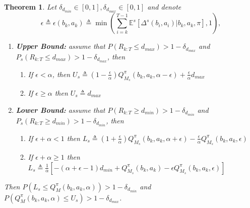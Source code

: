 \documentclass[acmlarge, manuscript, screen, review, natbib=false, oneside]{acmart}
\newtheorem{theorem}{Theorem}[section]
\begin{document}
\begin{theorem}\label{prf:uniform_lower_and_upper_bounds_for_v_and_q}
	Let $\delta_{d_{min}}\in [0, 1], \delta_{d_{max}}\in [0, 1]$ and denote 
	\begin{equation}
		\epsilon \triangleq \epsilon(b_k, a_k) \triangleq \min(\sum_{i=k}^{T-1} \mathbb{E}^s[\Delta^s(b_i, a_i)|b_k, a_k,\pi], 1),
	\end{equation}
	\begin{enumerate}
		\item \textbf{Upper Bound:} assume that $P(R_{k:T}\leq d_{max})>1-\delta_{d_{max}}$ and $P_s(R_{k:T}\leq d_{max})>1-\delta_{d_{max}}$, then \begin{enumerate}
			\item If $\epsilon<\alpha$, then
			$U_s\triangleq (1-\frac{\epsilon}{\alpha}) Q^\pi_{M_s}(b_k,a_k,\alpha-\epsilon) + \frac{\epsilon}{\alpha}d_{max}$
			\item If $\epsilon \geq \alpha$ then $U_s\triangleq d_{max}$
		\end{enumerate}
		\item \textbf{Lower Bound:} assume that $P(R_{k:T}\geq d_{min})>1-\delta_{d_{min}}$ and $P_s(R_{k:T}\geq d_{min})>1-\delta_{d_{min}}$, then \begin{enumerate}
			\item If $\epsilon + \alpha < 1$ then 
			$
			L_s\triangleq (1+\frac{\epsilon}{\alpha}) Q^\pi_{M_s}(b_k,a_k,\alpha+\epsilon) - \frac{\epsilon}{\alpha} Q^\pi_{M_s}(b_k,a_k, \epsilon)
			$
			\item If $\epsilon + \alpha \geq 1$ then 
			$
			L_s\triangleq\frac{1}{\alpha}[-(\alpha + \epsilon - 1)
			d_{min}+Q^\pi_{M_s}(b_k,a_k)-\epsilon Q^\pi_{M_s}(b_k,a_k,\epsilon)]
			$
		\end{enumerate}
	\end{enumerate}
	Then $P(L_s \leq Q_M^\pi(b_k, a_k,\alpha)) > 1-\delta_{d_{min}}$ and $P(Q_M^\pi(b_k, a_k,\alpha)\leq U_s)> 1-\delta_{d_{max}}$.
\end{theorem}
\end{document}

